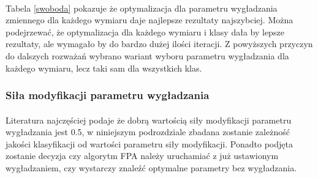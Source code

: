 \documentclass[a4paper,12pt,twoside]{article}
\begin{document}
\paragraph{}
Tabela \ref{swoboda} pokazuje że optymalizacja dla parametru wygładzania zmiennego dla każdego wymiaru daje najlepsze rezultaty najszybciej. Można podejrzewać, że optymalizacja dla każdego wymiaru i klasy dała by lepsze rezultaty, ale wymagało by do bardzo dużej ilości iteracji. Z powyższych przyczyn do dalszych rozważań wybrano wariant wyboru parametru wygładzania dla każdego wymiaru, lecz taki sam dla wszystkich klas. 

\subsubsection{Siła modyfikacji parametru wygładzania}
\paragraph{}
Literatura najczęściej podaje że dobrą wartością siły modyfikacji parametru wygładzania jest 0.5, w niniejszym podrozdziale zbadana zostanie zależność jakości klasyfikacji od wartości parametru siły modyfikacji. Ponadto podjęta zostanie decyzja czy algorytm FPA należy uruchamiać z już ustawionym wygładzaniem, czy wystarczy znaleźć optymalne parametry bez wygładzania. 
\end{document}
